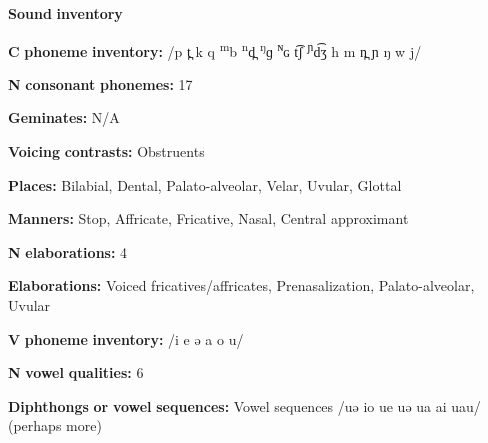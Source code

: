 \begin{styleBody}
\textbf{Sound} \textbf{inventory}
\end{styleBody}

\begin{styleBody}
\textbf{C} \textbf{phoneme} \textbf{inventory:} /p t̪ k q \textsuperscript{m}b \textsuperscript{n}d̪ \textsuperscript{ŋ}ɡ \textsuperscript{ɴ}ɢ t͡ʃ \textsuperscript{ɲ}d͡ʒ h m n̪ ɲ ŋ w j/
\end{styleBody}

\begin{styleBody}
\textbf{N} \textbf{consonant} \textbf{phonemes:} 17
\end{styleBody}

\begin{styleBody}
\textbf{Geminates:} N/A
\end{styleBody}

\begin{styleBody}
\textbf{Voicing} \textbf{contrasts:} Obstruents
\end{styleBody}

\begin{styleBody}
\textbf{Places:} Bilabial, Dental, Palato-alveolar, Velar, Uvular, Glottal
\end{styleBody}

\begin{styleBody}
\textbf{Manners:} Stop, Affricate, Fricative, Nasal, Central approximant
\end{styleBody}

\begin{styleBody}
\textbf{N} \textbf{elaborations:} 4
\end{styleBody}

\begin{styleBody}
\textbf{Elaborations:} Voiced fricatives/affricates, Prenasalization, Palato-alveolar, Uvular
\end{styleBody}

\begin{styleBody}
\textbf{V} \textbf{phoneme} \textbf{inventory:} /i e ə a o u/
\end{styleBody}

\begin{styleBody}
\textbf{N} \textbf{vowel} \textbf{qualities:} 6
\end{styleBody}

\begin{styleBody}
\textbf{Diphthongs} \textbf{or} \textbf{vowel} \textbf{sequences:} Vowel sequences /uə io ue uə ua ai uau/ (perhaps more)
\end{styleBody}

